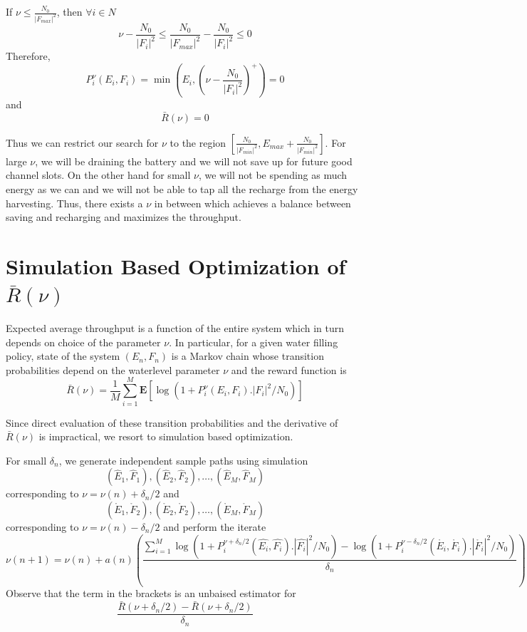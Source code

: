 \documentclass[a4paper,11pt]{article}
\begin{document}
If $\nu \leq \frac{N_0}{|F_{max}|^2}$, then $\forall i \in N$
\[ \nu - \frac{N_0}{|F_i|^2} \leq \frac{N_0}{|F_{max}|^2}- \frac{N_0}{|F_i|^2}  \leq 0
\] 
Therefore,
\[P_i^\nu(E_i,F_i) = \min\left(E_{i},\left (\nu - \frac{N_0}{|F_i|^2} \right )^+\right)
 = 0
\] 
and 
\[ \bar{R}(\nu) = 0 \]

Thus we can restrict our search for $\nu$ to the region $\left [\frac{N_0}{|F_{min}|^2},E_{max} + \frac{N_0}{|F_{min}|^2}\right ]$.
For large $\nu$, we will be draining the battery and we will not save up for future good channel slots. On the other hand for small $\nu$, we will not be spending as much energy as we can and we will not be able to tap all the recharge from the energy harvesting.
Thus, there exists a $\nu$ in between which achieves a balance between saving and recharging and maximizes the throughput.


\section{Simulation Based Optimization of $\bar{R}(\nu)$}
Expected average throughput is a function of the entire system which in turn depends on choice 
of the parameter $\nu$. In particular, for a given water filling policy, state of the system $(E_n,F_n)$ is a Markov chain whose transition probabilities depend on the waterlevel parameter $\nu$ and the reward function is 
\[ \bar{R}(\nu) =  \frac{1}{M}\sum_{i=1}^M\mathbf{E} [\log(1+ P_i^\nu(E_i,F_i).|F_i|^2/N_0)]\] 

Since direct evaluation of these transition probabilities  and the derivative of $\bar{R}(\nu)$ is impractical, we resort to simulation based optimization.

For small $\delta_n$, we generate independent sample paths using simulation 
\[(\hat{E}_1, \hat{F}_1) ,(\hat{E}_2,\hat{F}_2), \dots, (\hat{E}_M,\hat{F}_M)\]
corresponding to $\nu = \nu(n)+\delta_n/2$ and 
\[(\mathring{E}_1,\mathring{F}_2),(\mathring{E}_2,\mathring{F}_2),\dots, (\mathring{E}_M,\mathring{F}_M)\] 
corresponding to  $\nu = \nu(n) - \delta_n/2$
and perform the iterate 
\begin{dmath}
\nu(n+1) = \nu(n) + a(n)
\left(\frac{\sum_{i=1}^M \log(1+ P_i^{\nu+\delta_n/2}(\hat{E_i},\hat{F_i}).|\hat{F_i}|^2/N_0) - \log(1+ P_i^{\nu-\delta_n/2}(\mathring{E_i},\mathring{F_i}).|\mathring{F_i}|^2/N_0)}{\delta_n} \right) 
\label{eq:iter}
\end{dmath}
Observe that the term in the brackets is an unbaised estimator for 
\[
\frac{\bar{R}(\nu + \delta_n/2) -  \bar{R}(\nu + \delta_n/2) }{\delta_n}
\]
\end{document}

